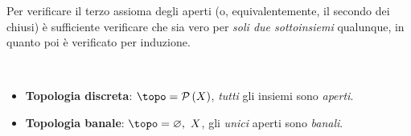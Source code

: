 \begin{observe}
	Per verificare il terzo assioma degli aperti (o, equivalentemente, il secondo dei chiusi) è sufficiente verificare che sia vero per \textit{soli due sottoinsiemi} qualunque, in quanto poi è verificato per induzione.
\end{observe}

\begin{examples}~{}
	\begin{itemize}
		\item \textbf{Topologia discreta}: $\topo=\setpart{X}$, \textit{tutti} gli insiemi sono \textit{aperti}.
		\item \textbf{Topologia banale}: $\topo={\emptyset,\ X}$, gli \textit{unici} aperti sono \textit{banali}.
	\end{itemize}
\vspace{-3mm}
\end{examples}
